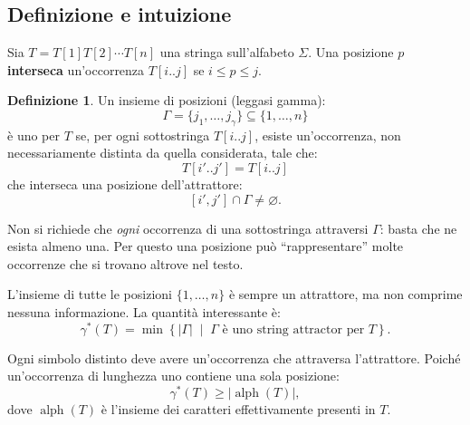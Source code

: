 \documentclass{article}
\theoremstyle{definition}
\newtheorem{definizione}{Definizione}[section]
\numberwithin{equation}{section}
\begin{document}
\subsection{Definizione e intuizione}
Sia $T=T[1]T[2]\cdots T[n]$ una stringa sull'alfabeto $\Sigma$. Una posizione
$p$ \textbf{interseca} un'occorrenza $T[i..j]$ se $i\leq p\leq j$.

\begin{definizione}
    Un insieme di posizioni (leggasi gamma):
    \[
        \Gamma=\{j_1,\ldots,j_{\gamma}\}
        \subseteq
        \{1,\ldots,n\}
    \]
    è uno \textbf{} per $T$ se, per ogni sottostringa
    $T[i..j]$, esiste un'occorrenza, non necessariamente distinta da quella
    considerata, tale che:
    \[
        T[i'..j']=T[i..j]
    \]
    che interseca una posizione dell'attrattore:
    \[
        [i',j']\cap\Gamma\neq\varnothing.
    \]
\end{definizione}

Non si richiede che \emph{ogni} occorrenza di una sottostringa attraversi
$\Gamma$: basta che ne esista almeno una. Per questo una posizione può
``rappresentare'' molte occorrenze che si trovano altrove nel testo.

L'insieme di tutte le posizioni $\{1,\ldots,n\}$ è sempre un attrattore, ma non
comprime nessuna informazione. La quantità interessante è:
\begin{equation}\label{eq:minimum_string_attractor}
    \gamma^*(T)
    =
    \min\left\{
    |\Gamma|
    \;\middle|\;
    \Gamma\text{ è uno string attractor per }T
    \right\}.
\end{equation}

Ogni simbolo distinto deve avere un'occorrenza che attraversa l'attrattore.
Poiché un'occorrenza di lunghezza uno contiene una sola posizione:
\begin{equation}\label{eq:attractor_alphabet_lower_bound}
    \gamma^*(T)\geq |\operatorname{alph}(T)|,
\end{equation}
dove $\operatorname{alph}(T)$ è l'insieme dei caratteri effettivamente
presenti in $T$.
\end{document}

